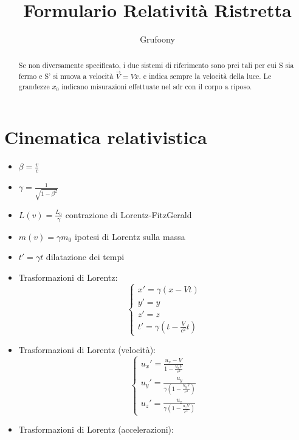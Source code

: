 \documentclass[a4paper]{article}
\begin{document}
	\title{Formulario Relatività Ristretta}
	\author{Grufoony}
	\maketitle
    \begin{abstract}
        Se non diversamente specificato, i due sistemi di riferimento sono prei tali per cui S sia fermo e S' si muova a velocità $\vec{V}=V\hat{x}$.
        c indica sempre la velocità della luce. Le grandezze $x_0$ indicano misurazioni effettuate nel sdr con il corpo a riposo.
    \end{abstract}
    \section{Cinematica relativistica}
        \begin{itemize}
            \item $\beta=\frac{v}{c}$
            \item $\gamma=\frac{1}{\sqrt{1-\beta^2}}$
            \item $L(v)=\frac{L_0}{\gamma}$ contrazione di Lorentz-FitzGerald
            \item $m(v)=\gamma m_0$ ipotesi di Lorentz sulla massa
            \item $t'=\gamma t$ dilatazione dei tempi
            \item Trasformazioni di Lorentz:\\
                $$\begin{cases}
                    x'=\gamma(x-Vt)\\
                    y'=y\\
                    z'=z\\
                    t'=\gamma\left(t-\frac{V}{c^2}t\right)
                \end{cases}$$
            \item Trasformazioni di Lorentz (velocità):\\
                $$\begin{cases}
                    u_x'=\frac{u_x-V}{1-\frac{u_xV}{c^2}}\\
                    u_y'=\frac{u_y}{\gamma\left(1-\frac{u_yV}{c^2}\right)}\\
                    u_z'=\frac{u_z}{\gamma\left(1-\frac{u_zV}{c^2}\right)}
                \end{cases}$$
            \item Trasformazioni di Lorentz (accelerazioni):\\

\end{itemize}
\end{document}
